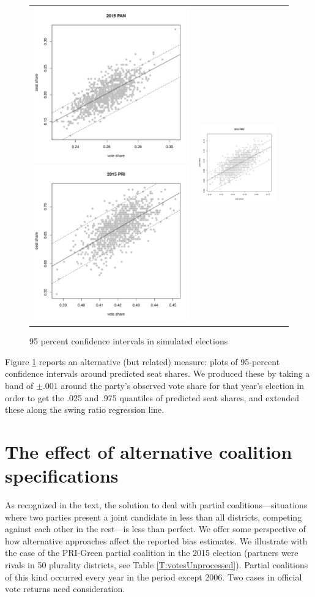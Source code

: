 \documentclass[letter,12pt]{article}
\begin{document}
\begin{figure}
\begin{tabular}{ccc}
  \includegraphics[width=.25\columnwidth]{../graphs/appendixPlots/95ciSwR-20152.pdf} 
  \includegraphics[width=.25\columnwidth]{../graphs/appendixPlots/95ciSwR-20151.pdf} &
  \includegraphics[width=.25\columnwidth]{../graphs/appendixPlots/95ciSwR-20153.pdf} \\
  \end{tabular}
  \caption{95 percent confidence intervals in simulated elections}\label{F:95pctcis}
\end{figure}

Figure \ref{F:95pctcis} reports an alternative (but related) measure: plots of 95-percent confidence intervals around predicted seat shares. We produced these by taking a band of $\pm.001$ around the party's observed vote share for that year's election in order to get the .025 and .975 quantiles of predicted seat shares, and extended these along the swing ratio regression line. 

\section{The effect of alternative coalition specifications}

As recognized in the text, the solution to deal with partial coalitions---situations where two parties present a joint candidate in less than all districts, competing against each other in the rest---is less than perfect. We offer some perspective of how alternative approaches affect the reported bias estimates. We illustrate with the case of the PRI-Green partial coalition in the 2015 election (partners were rivals in 50 plurality districts, see Table \ref{T:votesUnprocessed}). Partial coalitions of this kind occurred every year in the period except 2006. Two cases in official vote returns need consideration. 
\end{document}
